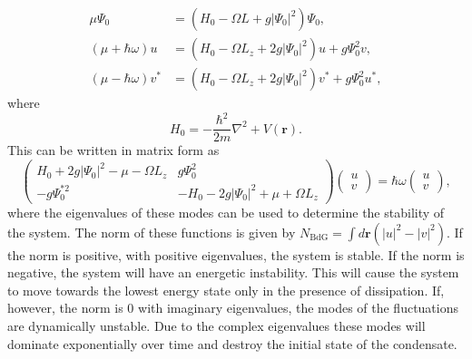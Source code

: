 \begin{subequations}\label{eqn:bogo_lhsrhs}
\begin{align}
    \mu \Psi_0 &= (H_0 - \Omega L + g |\Psi_0|^2)\Psi_0,\\
    (\mu +\hbar\omega)u &= (H_0 - \Omega L_z + 2g|\Psi_0|^2)u + g\Psi_0^2 v,\\
    (\mu -\hbar\omega)v^{*} &= (H_0 - \Omega L_z + 2g|\Psi_0|^2)v^{*} + g\Psi_0^2 u^{*},
\end{align}
\end{subequations}
where
\begin{equation}\label{eqn:bogo_h0}
H_0 = -\frac{\hbar^2}{2m}\nabla^2 + V(\mathbf{r}).
\end{equation}
This can be written in matrix form as
\begin{equation}
    \begin{pmatrix}
        H_0 + 2g|\Psi_0|^2- \mu -\Omega L_z & g\Psi_0^2 \\
        -g\Psi_0^{*2} & -H_0 - 2g|\Psi_0|^2 + \mu +\Omega L_z
    \end{pmatrix}
    \begin{pmatrix}
        u \\
        v
    \end{pmatrix}
    = \hbar\omega
    \begin{pmatrix}
        u \\
        v
    \end{pmatrix},
\end{equation}
where the eigenvalues of these modes can be used to determine the stability of the system. The norm of these functions is given by $N_{\textrm{BdG}}=\int d\mathbf{r}(|u|^2 - |v|^2)$. If the norm is positive, with positive eigenvalues, the system is stable. If the norm is negative, the system will have an energetic instability. This will cause the system to move towards the lowest energy state only in the presence of dissipation. If, however, the norm is 0 with imaginary eigenvalues, the modes of the fluctuations are dynamically unstable. Due to the complex eigenvalues these modes will dominate exponentially over time and destroy the initial state of the condensate. %

